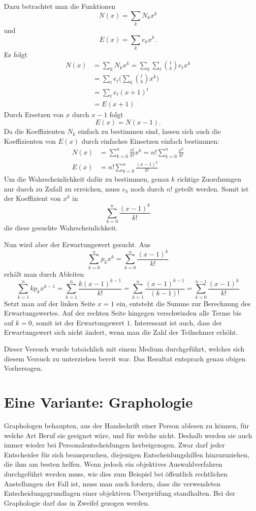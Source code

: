 Dazu betrachtet man die Funktionen
$$N(x)=\sum_{k}N_kx^k$$
und 
$$E(x)=\sum_{k}e_kx^k.$$
Es folgt
\begin{align*}
N(x)&=\sum_kN_kx^k=\sum_k\sum_t\binom{t}{k}e_tx^k\\
&=\sum_te_t\biggl(\sum_k\binom{t}{k}x^k\biggr)\\
&=\sum_te_t(x+1)^t\\
&=E(x+1)
\end{align*}
Durch Ersetzen von $x$ durch $x-1$ folgt
$$E(x)=N(x-1).$$
Da die Koeffizienten $N_k$ einfach zu bestimmen sind, lassen sich auch
die Koeffizienten von $E(x)$ durch einfaches Einsetzen einfach
bestimmen:
\begin{align*}
N(x)&=\sum_{k=0}^n\frac{n!}{k!}x^k=n!\sum_{k=0}^n\frac{x^k}{k!}\\
E(x)&=n!\sum_{k=0}^n\frac{(x-1)^k}{k!}
\end{align*}
Um die Wahrscheinlichkeit dafür zu bestimmen, genau $k$ richtige Zuordnungen nur
durch zu Zufall zu erreichen, muss $e_k$ noch durch $n!$ geteilt werden.
Somit
ist der Koeffizient von $x^k$ in
$$\sum_{k=0}^n\frac{(x-1)^k}{k!}$$
die diese gesuchte Wahrscheinlichkeit.

Nun wird aber der Erwartungswert gesucht.
Aus
$$\sum_{k=0}^np_kx^k=\sum_{k=0}^n\frac{(x-1)^k}{k!}$$
erhält man durch Ableiten
$$
\sum_{k=1}^nkp_kx^{k-1}
=\sum_{k=1}^n\frac{k(x-1)^{k-1}}{k!}
=\sum_{k=1}^n\frac{(x-1)^{k-1}}{(k-1)!}
=\sum_{k=0}^{n-1}\frac{(x-1)^k}{k!}
$$
Setzt man auf der linken Seite $x=1$ ein, entsteht die Summe zur
Berechnung des Erwartungswertes.
Auf der rechten Seite hingegen
verschwinden alle Terme bis auf $k=0$, somit ist der Erwartungswert
$1$.
Interessant ist auch, dass der Erwartungswert sich nicht ändert,
wenn man die Zahl der Teilnehmer erhöht.

Dieser Versuch wurde tatsächlich mit einem Medium durchgeführt, welches
sich diesem Versuch zu unterziehen bereit war.
Das Resultat entsprach genau
obigen Vorhersagen.

\section{Eine Variante: Graphologie}
Graphologen behaupten, aus der Handschrift einer Person ablesen zu können,
für welche Art Beruf sie geeignet wäre, und für welche nicht.
Deshalb
werden sie auch immer wieder bei Personalentscheidungen herbeigezogen.
Zwar darf jeder Entscheider für sich beanspruchen, diejenigen Entscheidungshilfen
hinzuzuziehen, die ihm am besten helfen.
Wenn jedoch ein objektives
Auswahlverfahren durchgeführt werden muss, wie dies zum Beispiel bei
öffentlich rechtlichen Anstellungen der Fall ist, muss man auch
fordern, dass die verwendeten Entscheidungsgrundlagen einer objektiven
Überprüfung standhalten.
Bei der Graphologie darf das in Zweifel
gezogen werden.

